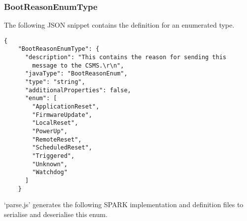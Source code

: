 \documentclass[12pt,openany,a4paper]{book}
\begin{document}
\subsubsection{BootReasonEnumType}
The following JSON snippet contains the definition for an enumerated type.
\begin{verbatim}
{
    "BootReasonEnumType": {
      "description": "This contains the reason for sending this 
      	message to the CSMS.\r\n",
      "javaType": "BootReasonEnum",
      "type": "string",
      "additionalProperties": false,
      "enum": [
        "ApplicationReset",
        "FirmwareUpdate",
        "LocalReset",
        "PowerUp",
        "RemoteReset",
        "ScheduledReset",
        "Triggered",
        "Unknown",
        "Watchdog"
      ]
    }
\end{verbatim}

`parse.js' generates the following SPARK implementation and definition files to serialise and deserialise this enum.
\end{document}
